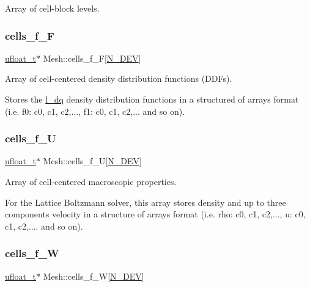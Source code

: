 Array of cell-\/block levels. 

\mbox{\label{classMesh_af25ca4c4bc4150feb9b5d6652f8f8819}} 
\subsubsection{\texorpdfstring{cells\+\_\+f\+\_\+F}{cells\_f\_F}}
{\footnotesize\ttfamily \hyperlink{cppspec_8h_af529d360dfac9b9578aa719418a53a21}{ufloat\+\_\+t}$\ast$ Mesh\+::cells\+\_\+f\+\_\+F\mbox{[}\hyperlink{cppspec_8h_a2b674dab7a14f1bf32b48b7fda5022dc}{N\+\_\+\+D\+EV}\mbox{]}}



Array of cell-\/centered density distribution functions (D\+D\+Fs). 

Stores the \hyperlink{lbm_8h_acfb5feff3d74c31fd8abe42a30a1f769}{l\+\_\+dq} density distribution functions in a structured of arrays format (i.\+e. f0\+: c0, c1, c2,..., f1\+: c0, c1, c2,... and so on). \mbox{\label{classMesh_a242518ffb09784e8a6c6ebb13c4ec039}} 
\subsubsection{\texorpdfstring{cells\+\_\+f\+\_\+U}{cells\_f\_U}}
{\footnotesize\ttfamily \hyperlink{cppspec_8h_af529d360dfac9b9578aa719418a53a21}{ufloat\+\_\+t}$\ast$ Mesh\+::cells\+\_\+f\+\_\+U\mbox{[}\hyperlink{cppspec_8h_a2b674dab7a14f1bf32b48b7fda5022dc}{N\+\_\+\+D\+EV}\mbox{]}}



Array of cell-\/centered macroscopic properties. 

For the Lattice Boltzmann solver, this array stores density and up to three components velocity in a structure of arrays format (i.\+e. rho\+: c0, c1, c2,..., u\+: c0, c1, c2,.... and so on). \mbox{\label{classMesh_a6b9285bbb403bd26c6e3a7fe6c93c593}} 
\subsubsection{\texorpdfstring{cells\+\_\+f\+\_\+W}{cells\_f\_W}}
{\footnotesize\ttfamily \hyperlink{cppspec_8h_af529d360dfac9b9578aa719418a53a21}{ufloat\+\_\+t}$\ast$ Mesh\+::cells\+\_\+f\+\_\+W\mbox{[}\hyperlink{cppspec_8h_a2b674dab7a14f1bf32b48b7fda5022dc}{N\+\_\+\+D\+EV}\mbox{]}}



